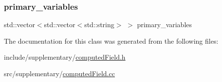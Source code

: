 \subsubsection{\texorpdfstring{primary\_variables}{primary\_variables}}
{\footnotesize\ttfamily std\+::vector$<$std\+::vector$<$std\+::string$>$ $>$ primary\+\_\+variables}



The documentation for this class was generated from the following files\+:\begin{DoxyCompactItemize}
\item 
include/supplementary/\mbox{\hyperlink{computed_field_8h}{computed\+Field.\+h}}\item 
src/supplementary/\mbox{\hyperlink{computed_field_8cc}{computed\+Field.\+cc}}\end{DoxyCompactItemize}
